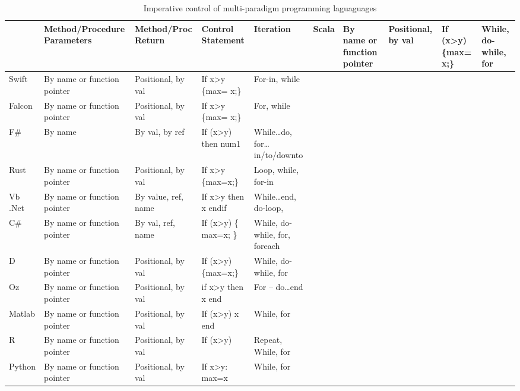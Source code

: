 \documentclass{sig-alternate}
\begin{document}
	\begin{table*}[]
		\centering
		\caption{Imperative control of multi-paradigm programming laguaguages}
		
		\begin{tabular}{|l|l|l|l|l|}
			\hline
			&Method/Procedure Parameters & Method/Proc Return & Control Statement & Iteration                                            &                               \hline
			Scala           & By name or function pointer & Positional, by val                                                                  & If (x\textgreater{}y) \{max= x;\}    & While, do-while, for          \\ \hline
			Swift                    & By name or function pointer & Positional, by val                          & If x\textgreater{}y \{max= x;\}      & For-in, while                 \\ \hline
			Falcon                    & By name or function pointer & Positional, by val                                  & If x\textgreater{}y \{max= x;\}      & For, while                    \\ \hline
			F\#                      & By name                     & By val, by ref                                  & If (x\textgreater{}y) then num1           & While…do, for…in/to/downto    \\ \hline
			Rust                     & By name or function pointer & Positional, by val                       & If x\textgreater{}y \{max=x;\}   & Loop, while, for-in           \\ \hline
			Vb .Net                          & By name or function pointer & By value, ref, name                                     & If x\textgreater{}y then x endif              & While…end, do-loop, \\ \hline
			C\#              & By name or function pointer & By val, ref, name & If (x\textgreater{}y) \{ max=x; \} & While, do-while, for, foreach \\ \hline
			D                          & By name or function pointer & Positional, by val                       & If (x\textgreater{}y) \{max=x;\}     & While, do-while, for          \\ \hline
			Oz           & By name or function pointer & Positional, by val                                                                   & if x\textgreater{}y then x end                & For – do…end                  \\ \hline
			Matlab                     & By name or function pointer & Positional, by val                                              & If (x\textgreater{}y) x end                   & While, for                    \\ \hline
			R                          & By name or function pointer & Positional, by val                          & If (x\textgreater{}y)     & Repeat, While, for            \\ \hline
			Python                     & By name or function pointer & Positional, by val                                                 & If x\textgreater{}y: max=x               & While, for                    \\ \hline
		\end{tabular}
	\end{table*}
	
\end{document}
